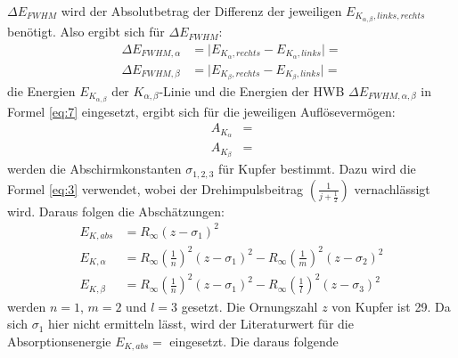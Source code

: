     \justifying $\Delta E_{FWHM}$ wird der Absolutbetrag der Differenz der jeweiligen $E_{K_{\alpha,\beta},links,rechts}$ benötigt.
    Also ergibt sich für $\Delta E_{FWHM}$:
    \begin{subequations}\label{eq:16}
    \begin{align}
        \Delta E_{FWHM, \alpha} &= \vert E_{K_{\alpha},rechts}-E_{K_{\alpha},links} \vert = \text{} \label{eq:16a}\\
        \Delta E_{FWHM, \beta} &= \vert E_{K_{\beta},rechts}-E_{K_{\beta},links} \vert = \text{} \label{eq:16b}
    \end{align}
    \end{subequations}
    \justifying die Energien $E_{K_{\alpha, \beta}}$ der $K_{\alpha,\beta}$-Linie und die Energien der HWB 
    $\Delta E_{FWHM, \alpha, \beta}$ in Formel \eqref{eq:7} eingesetzt, ergibt sich für die jeweiligen Auflösevermögen:
    \begin{subequations}\label{eq:17}
    \begin{align}
        A_{K_{\alpha}} &= \text{} \label{eq:17a}\\
        A_{K_{\beta}} &= \text{} \label{eq:17b}
    \end{align}
    \end{subequations}
    \justifying werden die Abschirmkonstanten $\sigma_{1,2,3}$ für Kupfer bestimmt. Dazu wird die Formel \eqref{eq:3}
    verwendet, wobei der Drehimpulsbeitrag $\left( \frac{1}{j+\frac{1}{2}} \right)$ vernachlässigt wird. Daraus folgen die Abschätzungen:
    \begin{subequations}\label{eq:18}
    \begin{align}
        E_{K,abs} &= R_{\infty} (z-\sigma_1)^2 \label{eq:18a}\\
        E_{K,\alpha} &= R_{\infty} \left( \frac{1}{n} \right)^2 (z-\sigma_1)^2 - R_{\infty} \left( \frac{1}{m} \right)^2 (z-\sigma_2)^2 \label{eq:18b}\\
        E_{K,\beta} &= R_{\infty} \left( \frac{1}{n} \right)^2 (z-\sigma_1)^2 - R_{\infty} \left( \frac{1}{l} \right)^2 (z-\sigma_3)^2 \label{eq:18c}
    \end{align}
    \end{subequations}
    \justifying werden $n=1$, $m=2$ und $l=3$ gesetzt. Die Ornungszahl $z$ von Kupfer ist 29. Da sich $\sigma_1$ hier nicht ermitteln lässt, 
    wird der Literaturwert für die Absorptionsenergie $E_{K,abs}= \text{}$ eingesetzt. Die daraus folgende 
